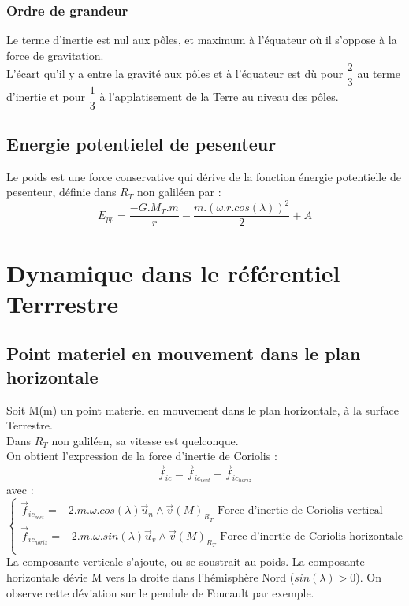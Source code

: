\subsubsection{Ordre de grandeur}
Le terme d'inertie est nul aux pôles, et maximum à l'équateur où il s'oppose à la force de gravitation.\\
L'écart qu'il y a entre la gravité aux pôles et à l'équateur est dù pour $\dfrac{2}{3}$ au terme d'inertie et pour $\dfrac{1}{3}$ à l'applatisement de la Terre au niveau des pôles.
\subsection{Energie potentielel de pesenteur}
\begin{prop}
Le poids est une force conservative qui dérive de la fonction énergie potentielle de pesenteur, définie dans $R_T$ non galiléen par : 
$$E_{pp} = \dfrac{-G.M_T.m}{r} - \dfrac{m.(\omega.r.cos(\lambda))^2}{2} + A$$ 
\end{prop}
\section{Dynamique dans le référentiel Terrrestre}
\subsection{Point materiel en mouvement dans le plan horizontale}
Soit M(m) un point materiel en mouvement dans le plan horizontale, à la surface Terrestre.\\
Dans $R_T$ non galiléen, sa vitesse est quelconque.\\
On obtient l'expression de la force d'inertie de Coriolis : 
$$\overrightarrow{f}_{ic} = \overrightarrow{f}_{ic_{vect}} + \overrightarrow{f}_{ic_{horiz}}$$
avec : 
$$\left\{\begin{array}{l}
   \overrightarrow{f}_{ic_{vect}}  = -2.m.\omega.cos(\lambda)\overrightarrow{u}_n\wedge\overrightarrow{v}(M)_{R_T} \mbox{ Force d'inertie de Coriolis vertical}\\
\overrightarrow{f}_{ic_{horiz}}  = -2.m.\omega.sin(\lambda)\overrightarrow{u}_v\wedge\overrightarrow{v}(M)_{R_T} \mbox{ Force d'inertie de Coriolis horizontale}\\
  \end{array}\right.$$
La composante verticale s'ajoute, ou se soustrait au poids. La composante horizontale dévie M vers la droite dans l'hémisphère Nord ($sin(\lambda) > 0$). On observe cette déviation sur le pendule de Foucault par exemple.
